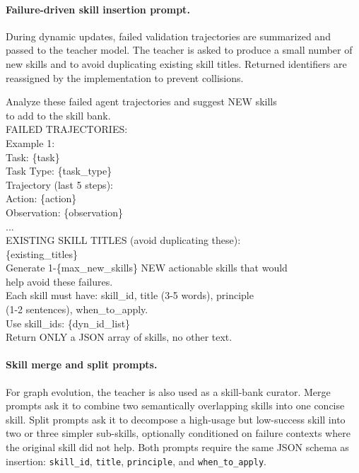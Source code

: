 \paragraph{Failure-driven skill insertion prompt.}
During dynamic updates, failed validation trajectories are summarized and passed to the teacher model. The teacher is asked to produce a small number of new skills and to avoid duplicating existing skill titles. Returned identifiers are reassigned by the implementation to prevent collisions.

\begin{tcolorbox}[colback=orange!3, colframe=orange!50, title={\small\textbf{Failure-Driven Skill Insertion Prompt}}, fontupper=\small\ttfamily, breakable, left=4pt, right=4pt, top=2pt, bottom=2pt]
Analyze these failed agent trajectories and suggest NEW skills\\
to add to the skill bank.\\[4pt]
FAILED TRAJECTORIES:\\
Example 1:\\
\quad Task: \{task\}\\
\quad Task Type: \{task\_type\}\\
\quad Trajectory (last 5 steps):\\
\quad\quad Action: \{action\}\\
\quad\quad Observation: \{observation\}\\
\quad ...\\[4pt]
EXISTING SKILL TITLES (avoid duplicating these):\\
\{existing\_titles\}\\[4pt]
Generate 1-\{max\_new\_skills\} NEW actionable skills that would\\
help avoid these failures.\\
Each skill must have: skill\_id, title (3-5 words), principle\\
(1-2 sentences), when\_to\_apply.\\[4pt]
Use skill\_ids: \{dyn\_id\_list\}\\[4pt]
Return ONLY a JSON array of skills, no other text.
\end{tcolorbox}

\paragraph{Skill merge and split prompts.}
For graph evolution, the teacher is also used as a skill-bank curator. Merge prompts ask it to combine two semantically overlapping skills into one concise skill. Split prompts ask it to decompose a high-usage but low-success skill into two or three simpler sub-skills, optionally conditioned on failure contexts where the original skill did not help. Both prompts require the same JSON schema as insertion: \texttt{skill\_id}, \texttt{title}, \texttt{principle}, and \texttt{when\_to\_apply}.

